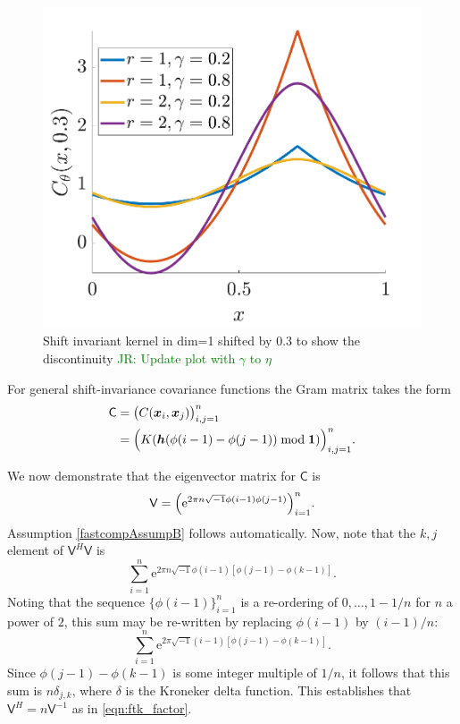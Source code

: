 \documentclass{iitthesis}          %
\newcommand{\bm}[1]{\boldsymbol{#1}}
\newcommand{\vh}{\bm{h}}
\newcommand{\vx}{\bm{x}}
\newcommand{\vone}{\bm{1}}
\newcommand{\mC}{\mathsf{C}}
\newcommand{\mV}{\mathsf{V}}
\newcommand{\me}{\mathrm{e}}
\newcommand{\JRNote}[1]{{\textcolor{green}{JR: #1}}}
\begin{document}
\begin{figure}
	\centering
	\includegraphics[width=0.9\linewidth]{"figures/fourier_kernel dim_1"}
	\caption[Fourier kernel]{Shift invariant kernel in dim=1 shifted by 0.3 to show the discontinuity \JRNote{Update plot with $\gamma$ to $\eta$}}
	\label{fig:fourierkernel-dim1}
\end{figure}



For general shift-invariance covariance functions the Gram matrix takes the form
\begin{align*}
\mC &= \bigl ( C(\vx_i, \vx_j) \bigr)_{i, j = 1}^n \\
& = \Bigl ( K(\vh(\phi(i-1) - \phi(j-1)) \bmod \vone ) \Bigr)_{i, j = 1}^n.
\end{align*}

We now demonstrate that the eigenvector matrix for $\mC$ is 
\begin{equation} \label{latticeVdef}
\mV = \Bigl ( \me^{2 \pi n \sqrt{-1} \phi(i-1)\phi(j-1)} \Bigr)_{i = 1}^n.
\end{equation}
Assumption \eqref{fastcompAssumpB} follows automatically.
Now, note that the $k,j$ element of $\mV^H\mV$ is
\begin{equation*}
\sum_{i=1}^n \me^{2 \pi n \sqrt{-1} \phi(i-1)[\phi(j-1) - \phi(k-1)]}.
\end{equation*}
Noting that the sequence $\{\phi(i-1)\}_{i=1}^n$ is a re-ordering of $0, \ldots, 1-1/n$ for $n$ a power of $2$, this sum may be re-written by replacing $\phi(i-1)$ by $(i-1)/n$:
\begin{equation*}
\sum_{i=1}^n \me^{2 \pi \sqrt{-1} (i-1)[\phi(j-1) - \phi(k-1)]}.
\end{equation*}
Since $\phi(j-1) - \phi(k-1)$ is some integer multiple of $1/n$, it follows that this sum is $n \delta_{j,k}$, where $\delta$ is the Kroneker delta function.  This establishes that $\mV^H = n \mV^{-1}$ as in \eqref{eqn:ftk_factor}.
\end{document}

